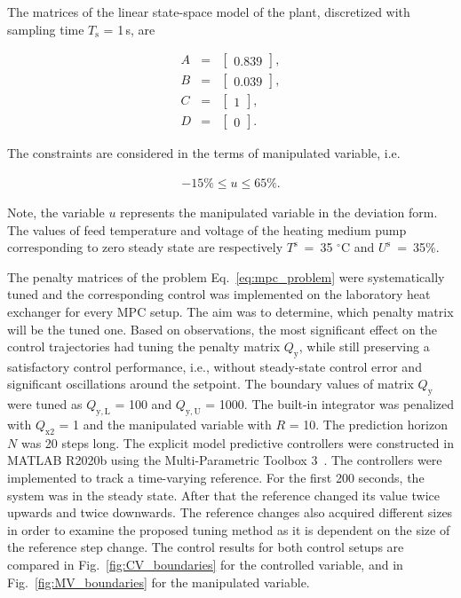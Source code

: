 \documentclass[preprint,12pt]{elsarticle}
\begin{document}
The matrices of the linear state-space model of the plant, discretized with sampling time $T_\mathrm{s}$ = 1\,s, are

\begin{subequations}
	\label{eq:model_A_B} 
	\begin{eqnarray}
		A&=&\begin{bmatrix}
			0.839
		\end{bmatrix}, \\
		B&=&\begin{bmatrix}
			0.039
		\end{bmatrix}, \\
		C&=&\begin{bmatrix}
			1
		\end{bmatrix}, \\
		D&=&\begin{bmatrix}
			0
		\end{bmatrix}.
		\end{eqnarray}
\end{subequations}

The constraints are considered in the terms of manipulated variable, i.e.

\begin{eqnarray}
\label{eq:u_const}
	-15\% \le u \le 65\%.
\end{eqnarray}

Note, the variable $u$ represents the manipulated variable in the deviation form. The values of feed temperature and voltage of the heating medium pump corresponding to zero steady state are respectively $T^\mathrm{s}$~=~35 $^{\circ}\mathrm{C}$ and $U^\mathrm{s}$~=~35\%.

The penalty matrices of the problem Eq.~\eqref{eq:mpc_problem} were systematically tuned and the corresponding control was implemented on the laboratory heat exchanger for every MPC setup. The aim was to determine, which penalty matrix will be the tuned one. Based on observations, the most significant effect on the control trajectories had tuning the penalty matrix $Q_\mathrm{y}$, while still preserving a satisfactory control performance, i.e., without steady-state control error and significant oscillations around the setpoint. The boundary values of matrix $Q_\mathrm{y}$ were tuned as $Q_\mathrm{y, L}$ = 100 and $Q_\mathrm{y, U}$ = 1000. The built-in integrator was penalized with $Q_\mathrm{x2}$ = 1 and the manipulated variable with $R$ = 10. The prediction horizon $N$ was 20 steps long. The explicit model predictive controllers were constructed in MATLAB R2020b using the Multi-Parametric Toolbox 3~\cite{mpt_conf}. 
The controllers were implemented to track a time-varying reference. For the first 200 seconds, the system was in the steady state. After that the reference changed its value twice upwards and twice downwards. The reference changes also acquired different sizes in order to examine the proposed tuning method as it is dependent on the size of the reference step change. The control results for both control setups are compared in Fig.~\ref{fig:CV_boundaries} for the controlled variable, and in Fig.~\ref{fig:MV_boundaries} for the manipulated variable.
    
\end{document}

